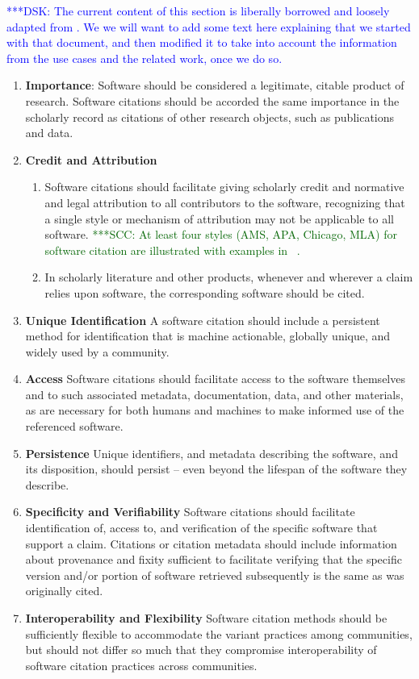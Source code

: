 \documentclass[11pt, oneside]{amsart}
\newcommand{\katznote}[1]{ {\textcolor{blue} { ***DSK: #1 }}}
\newcommand{\scnote}[1]{ {\textcolor{darkgreen} { ***SCC: #1 }}} %
\begin{document}
\katznote{The current content of this section is liberally borrowed and loosely adapted from \cite{data-citation-principles}.  We we will want to add some text here explaining that we started with that document, and then modified it to take into account the information from the use cases and the related work, once we do so.}

\begin{enumerate}
\item \textbf{Importance}:
Software should be considered a legitimate, citable product of research. Software citations should be accorded the same importance in the scholarly record as citations of other research objects, such as publications and data.
\item \textbf{Credit and Attribution}
\begin{enumerate}
\item Software citations should facilitate giving scholarly credit and normative and legal attribution to all contributors to the software, recognizing that a single style or mechanism of attribution may not be applicable to all software.\scnote{At least four styles (AMS, APA, Chicago, MLA) for software citation are illustrated with examples in ~\cite{lipson2011cite}.}
\item In scholarly literature and other products, whenever and wherever a claim relies upon software, the corresponding software should be cited.
\end{enumerate}
\item \textbf{Unique Identification}
A software citation should include a persistent method for identification that is machine actionable, globally unique, and widely used by a community.
\item \textbf{Access}
Software citations should facilitate access to the software themselves and to such associated metadata, documentation, data, and other materials, as are necessary for both humans and machines to make informed use of the referenced software.
\item \textbf{Persistence}
Unique identifiers, and metadata describing the software, and its disposition, should persist -- even beyond the lifespan of the software they describe.
\item \textbf{Specificity and Verifiability}
Software citations should facilitate identification of, access to, and verification of the specific software that support a claim. Citations or citation metadata should include information about provenance and fixity sufficient to facilitate verifying that the specific version and/or portion of software retrieved subsequently is the same as was originally cited.
\item \textbf{Interoperability and Flexibility}
Software citation methods should be sufficiently flexible to accommodate the variant practices among communities, but should not differ so much that they compromise interoperability of software citation practices across communities.
\end{enumerate}
\end{document}
